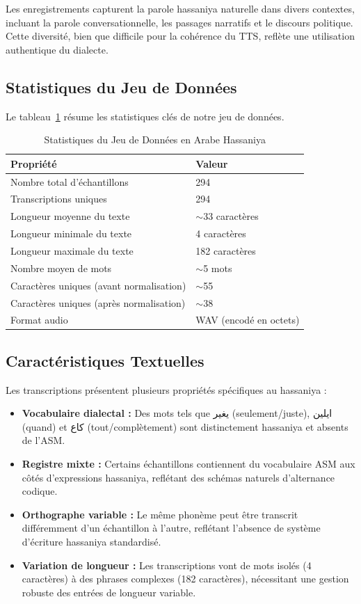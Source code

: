 \documentclass[12pt,a4paper]{article}
\begin{document}
Les enregistrements capturent la parole hassaniya naturelle dans divers contextes, incluant la parole conversationnelle, les passages narratifs et le discours politique. Cette diversité, bien que difficile pour la cohérence du TTS, reflète une utilisation authentique du dialecte.

\subsection{Statistiques du Jeu de Données}

Le tableau~\ref{tab:dataset_stats} résume les statistiques clés de notre jeu de données.

\begin{table}[H]
\centering
\caption{Statistiques du Jeu de Données en Arabe Hassaniya}
\label{tab:dataset_stats}
\begin{tabular}{ll}
\toprule
\textbf{Propriété} & \textbf{Valeur} \\
\midrule
Nombre total d'échantillons & 294 \\
Transcriptions uniques & 294 \\
Longueur moyenne du texte & $\sim$33 caractères \\
Longueur minimale du texte & 4 caractères \\
Longueur maximale du texte & 182 caractères \\
Nombre moyen de mots & $\sim$5 mots \\
Caractères uniques (avant normalisation) & $\sim$55 \\
Caractères uniques (après normalisation) & $\sim$38 \\
Format audio & WAV (encodé en octets) \\
\bottomrule
\end{tabular}
\end{table}

\subsection{Caractéristiques Textuelles}

Les transcriptions présentent plusieurs propriétés spécifiques au hassaniya :

\begin{itemize}
    \item \textbf{Vocabulaire dialectal :} Des mots tels que \textarabic{يغير} (seulement/juste), \textarabic{ايلين} (quand) et \textarabic{كاع} (tout/complètement) sont distinctement hassaniya et absents de l'ASM.
    \item \textbf{Registre mixte :} Certains échantillons contiennent du vocabulaire ASM aux côtés d'expressions hassaniya, reflétant des schémas naturels d'alternance codique.
    \item \textbf{Orthographe variable :} Le même phonème peut être transcrit différemment d'un échantillon à l'autre, reflétant l'absence de système d'écriture hassaniya standardisé.
    \item \textbf{Variation de longueur :} Les transcriptions vont de mots isolés (4 caractères) à des phrases complexes (182 caractères), nécessitant une gestion robuste des entrées de longueur variable.
\end{itemize}
\end{document}
